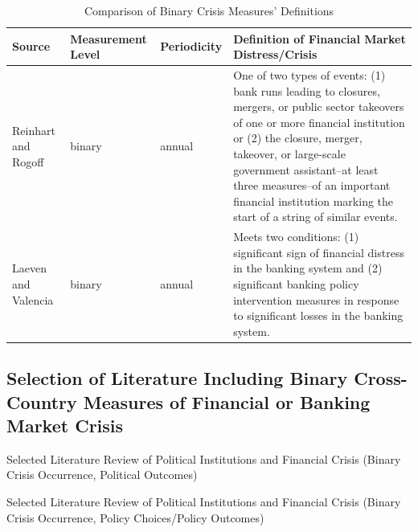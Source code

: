 \documentclass[]{article}
\begin{document}
\begin{table}[H]
    \caption{Comparison of Binary Crisis Measures' Definitions}
    \label{comp_table}
    \begin{center}
        \begin{tabular}{m{3cm} | m{2cm} m{2cm} m{7cm}}
            Source & Measurement Level & Periodicity &  Definition of Financial Market Distress/Crisis \\
            \hline\hline
                Reinhart and Rogoff \citeyearpar[11]{Reinhart2009,ReinhartRog2010} & binary & annual & One of two types of events: (1) bank runs leading to closures, mergers, or public sector takeovers of one or more financial institution or (2) the closure, merger, takeover, or large-scale government assistant--at least three measures--of an important financial institution marking the start of a string of similar events.  \\[1cm]
                Laeven and Valencia \citeyearpar[228]{laeven2013} & binary & annual & Meets two conditions: (1) significant sign of financial distress in the banking system and (2) significant banking policy intervention measures in response to significant losses in the banking system.  \\[1cm]
            \hline
        \end{tabular}
    \end{center}
\end{table}

\subsection*{Selection of Literature Including Binary Cross-Country Measures of Financial or Banking Market Crisis}

\begin{table}[H]
\caption{Selected Literature Review of Political Institutions and Financial
Crisis (Binary Crisis Occurrence, Political Outcomes)}


\label{LitRevTable2}
\begin{center}

\vspace{0.5cm}
{\tiny{

}}
\end{center}
\end{table}

\begin{table}[H]
\caption{Selected Literature Review of Political Institutions and Financial
Crisis (Binary Crisis Occurrence, Policy Choices/Policy Outcomes)}


\label{LitRevTable}
\begin{center}

\vspace{0.5cm}
{\tiny{

}}
\end{center}
\end{table}
\end{document}
